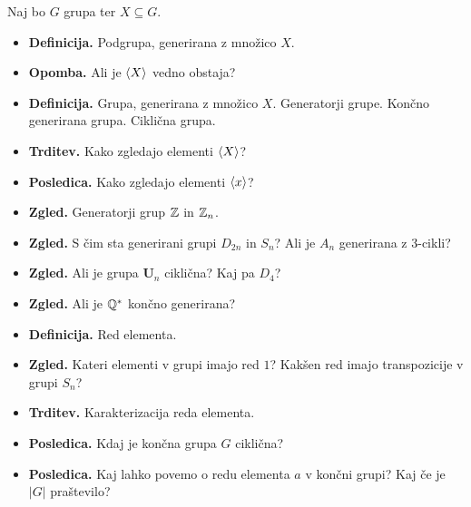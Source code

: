 \begin{enumerate}
    Naj bo \(G\) grupa ter \(X \subseteq G\).
    \begin{itemize}
        \item \textbf{Definicija.} Podgrupa, generirana z množico \(X\).
        \item \textbf{Opomba.} Ali je \(\langle {X} \rangle\) vedno obstaja?
        \item \textbf{Definicija.} Grupa, generirana z množico \(X\). Generatorji grupe. Končno generirana grupa. Ciklična grupa.
        \item \textbf{Trditev.} Kako zgledajo elementi \(\langle {X} \rangle\)?
        \item \textbf{Posledica.} Kako zgledajo elementi \(\langle {x} \rangle\)?
        \item \textbf{Zgled.} Generatorji grup \(\mathbb{Z}\) in \(\mathbb{Z}_n\). 
        \item \textbf{Zgled.} S čim sta generirani grupi \(D_{2n}\) in \(S_n\)? Ali je \(A_n\) generirana z 3-cikli?
        \item \textbf{Zgled.} Ali je grupa \(\textbf{U}_n\) ciklična? Kaj pa \(D_4\)?
        \item \textbf{Zgled.} Ali je \(\mathbb{Q}^*\) končno generirana?
        \item \textbf{Definicija.} Red elementa.
        \item \textbf{Zgled.} Kateri elementi v grupi imajo red \(1\)? Kakšen red imajo transpozicije v grupi \(S_n\)?
        \item \textbf{Trditev.} Karakterizacija reda elementa.
        \item \textbf{Posledica.} Kdaj je končna grupa \(G\) ciklična?
        \item \textbf{Posledica.} Kaj lahko povemo o redu elementa \(a\) v končni grupi? Kaj če je \(|G|\) praštevilo?
    \end{itemize}
\end{enumerate}

\newpage
